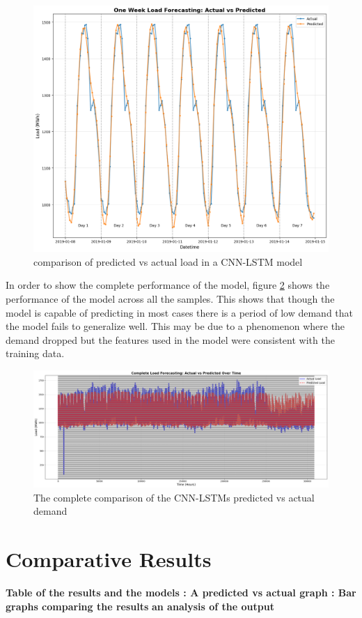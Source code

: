  \begin{figure}[h]
 	\centering
 	\includegraphics[width=0.9\linewidth,height=0.38\textwidth]{Chapters/images/results/cnn_lstm_prediction_vs_actual}
 	\caption{comparison of predicted vs actual load in a CNN-LSTM model}
 	\label{fig:cnnlstmpredictionvsactual}
 \end{figure}
 
 In order to show the complete performance of the model, figure \ref{fig:cnnlstmpredictionvsactualfull} shows the performance of the model across all the samples. This shows that though the model is capable of predicting in most cases there is a period of low demand that the model fails to generalize well. This may be due to a phenomenon where the demand dropped but the features used in the model were consistent with the training data.
 \begin{figure}[h]
 	\centering
 	\includegraphics[width=0.9\linewidth,height=0.3\textwidth]{Chapters/images/results/cnn_lstm_prediction_vs_actual_full}
 	\caption{The complete comparison of the CNN-LSTMs predicted vs actual demand}
 	\label{fig:cnnlstmpredictionvsactualfull}
 \end{figure}
 
 
 \section{Comparative Results}
 
 
 \textbf{Table of the results and the models : A predicted vs actual graph : Bar graphs comparing the results}
 \textbf{an analysis of the output}
 
